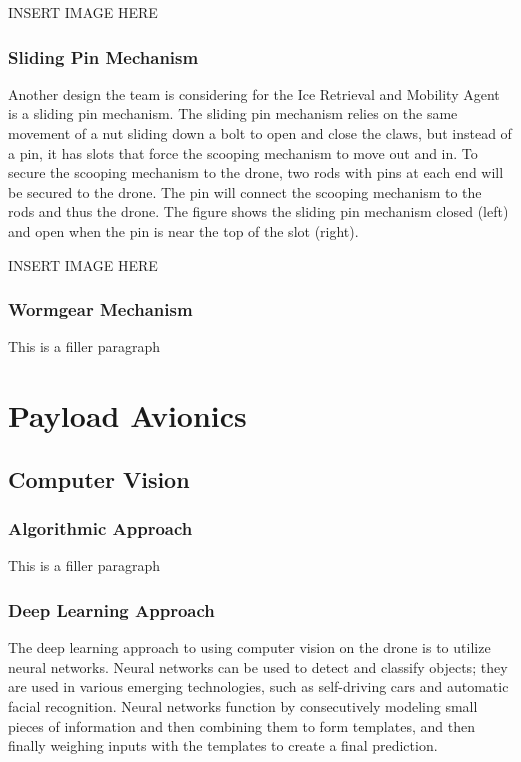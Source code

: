 			INSERT IMAGE HERE

		\subsubsection{Sliding Pin Mechanism}
			Another design the team is considering for the Ice Retrieval and Mobility Agent is a sliding pin mechanism. The sliding pin mechanism relies on the same movement of a nut sliding down a bolt to open and close the claws, but instead of a pin, it has slots that force the scooping mechanism to move out and in. To secure the scooping mechanism to the drone, two rods with pins at each end will be secured to the drone. The pin will connect the scooping mechanism to the rods and thus the drone. The figure shows the sliding pin mechanism closed (left) and open when the pin is near the top of the slot (right). 

			INSERT IMAGE HERE

		\subsubsection{Wormgear Mechanism}
			This is a filler paragraph

\section{Payload Avionics}\label{PL:Tradeoffs:Avionics}
	\subsection{Computer Vision}
		\subsubsection{Algorithmic Approach}
			This is a filler paragraph

		\subsubsection{Deep Learning Approach}
		The deep learning approach to using computer vision on the drone is to utilize neural networks. Neural networks can be used to detect and classify objects; they are used in various emerging technologies, such as self-driving cars and automatic facial recognition. 
		Neural networks function by consecutively modeling small pieces of information and then combining them to form templates, and then finally weighing inputs with the templates to create a final prediction.
		
